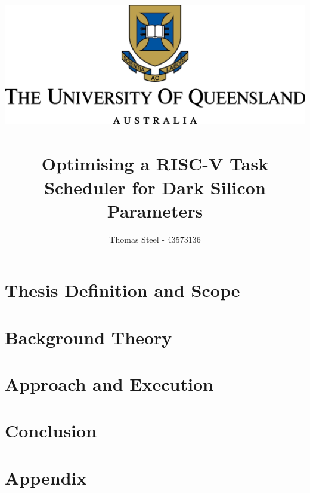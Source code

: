\documentclass[a4paper,12pt]{report}
\author{Thomas Steel - 43573136}
\title{
	\includegraphics[width=\textwidth]{PNGlogo.png}~\\[1cm]
	Optimising a RISC-V Task Scheduler for Dark Silicon Parameters
}
\begin{document}
	
	\maketitle
	\thispagestyle{empty}
	
	
	\thispagestyle{empty}
	\tableofcontents
	\thispagestyle{empty}
	
	
	\chapter{Thesis Definition and Scope}
	
	
	\chapter{Background Theory}
	
	
	\chapter{Approach and Execution}
	
	
	\chapter{Conclusion}
	
	
	\appendix
	\chapter{Appendix}
\end{document}
